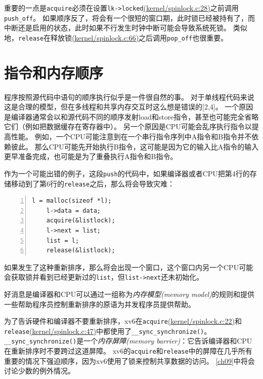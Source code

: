 重要的一点是\texttt{acquire}必须在设置\texttt{lk->locked}\href{https://github.com/mit-pdos/xv6-riscv/blob/riscv//kernel/spinlock.c#L28}{(kernel/spinlock.c:28)}之前调用\texttt{push\_off}。
如果顺序反了，将会有一个很短的窗口期，此时锁已经被持有了，而中断还是启用的状态，此时如果不行发生时钟中断可能会导致系统死锁。
类似地，\texttt{release}在释放锁\href{https://github.com/mit-pdos/xv6-riscv/blob/riscv//kernel/spinlock.c#L66}{(kernel/spinlock.c:66)}之后调用\texttt{pop\_off}也很重要。

\section{指令和内存顺序}
程序按照源代码中语句的顺序执行似乎是一件很自然的事。
对于单线程代码来说这是合理的模型，但在多线程和共享内存交互时这么想是错误的[2,4]。
一个原因是编译器通常会以和源代码不同的顺序发射load和store指令，甚至也可能完全省略它们（例如把数据缓存在寄存器中）。
另一个原因是CPU可能会乱序执行指令以提高性能。
例如，一个CPU可能注意到在一个串行指令序列中A指令和B指令并不依赖彼此。
那么CPU可能先开始执行B指令，这可能是因为它的输入比A指令的输入更早准备完成，也可能是为了重叠执行A指令和B指令。

作为一个可能出错的例子，这段\texttt{push}的代码中，如果编译器或者CPU把第4行的存储移动到了第6行的\texttt{release}之后，那么将会导致灾难：
\begin{lstlisting}[numbers=left]
    l = malloc(sizeof *l);
    l->data = data;
    acquire(&listlock);
    l->next = list;
    list = l;
    release(&listlock);
\end{lstlisting}
如果发生了这种重新排序，那么将会出现一个窗口，这个窗口内另一个CPU可能会获取锁并看到已经更新过的\texttt{list}，但\texttt{list->next}还未初始化。

好消息是编译器和CPU可以通过一组称为\emph{内存模型(memory model)}的规则和提供一些帮助程序员控制重新排序的原语为并发程序员提供帮助。

为了告诉硬件和编译器不要重新排序，xv6在\texttt{acquire}\href{https://github.com/mit-pdos/xv6-riscv/blob/riscv//kernel/spinlock.c#L22}{(kernel/spinlock.c:22)}和\texttt{release}\href{https://github.com/mit-pdos/xv6-riscv/blob/riscv//kernel/spinlock.c#L47}{(kernel/spinlock.c:47)}中都使用了\texttt{\_\_sync\_synchronize()}。
\texttt{\_\_sync\_synchronize()}是一个\emph{内存屏障(memory barrier)}：它告诉编译器和CPU在重新排序时不要跨过这道屏障。
xv6的\texttt{acquire}和\texttt{release}中的屏障在几乎所有重要的情况下强迫顺序，因为xv6使用了锁来控制共享数据的访问。
\autoref{ch09}中将会讨论少数的例外情况。

